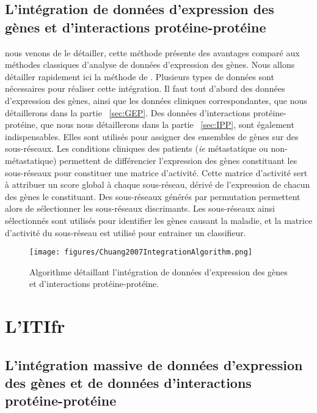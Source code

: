 		\subsection{\textcolor{mygreen}{L'intégration de données d'expression des gènes et d'interactions protéine-protéine}}
			 nous venons de le détailler, cette méthode présente des avantages comparé aux méthodes classiques d'analyse de données d'expression des gènes.
			Nous allons détailler rapidement ici la méthode de \citeauthor{Chuang2007}.
			Plusieurs types de données sont nécessaires pour réaliser cette intégration.
			Il faut tout d'abord des données d'expression des gènes, ainsi que les données cliniques correspondantes, que nous détaillerons dans la partie ~\ref{sec:GEP}.
			Des données d'interactions protéine-protéine, que nous nous détaillerons dans la partie ~\ref{sec:IPP}, sont également indispensables.
			Elles sont utilisés pour assigner des ensembles de gènes sur des sous-réseaux.
			Les conditions cliniques des patients (\emph{ie} métastatique ou non-métastatique) permettent de différencier l'expression des gènes constituant les sous-réseaux pour constituer une matrice d'activité.
			Cette matrice d'activité sert à attribuer un score global à chaque sous-réseau, dérivé de l'expression de chacun des gènes le constituant.
			Des sous-réseaux générés par permutation permettent alors de sélectionner les sous-réseaux discrimants.
			Les sous-réseaux ainsi sélectionnés sont utilisés pour identifier les gènes causant la maladie, et la matrice d'activité du sous-réseau est utilisé pour entrainer un classifieur.

			\begin{figure}
				\centering
				\texttt{[image: figures/Chuang2007IntegrationAlgorithm.png]}
				\caption{Algorithme détaillant l'intégration de données d'expression des gènes et d'interactions protéine-protéine\citep{Chuang2007}.}
				\label{fig:Chuang2007IntegrationAlgorithm}
			\end{figure}
		
	\section{\textcolor{mygreen}{L'\acl{ITIfr}}}

		\subsection{\textcolor{mygreen}{L'intégration massive de données d'expression des gènes et de données d'interactions protéine-protéine}}

